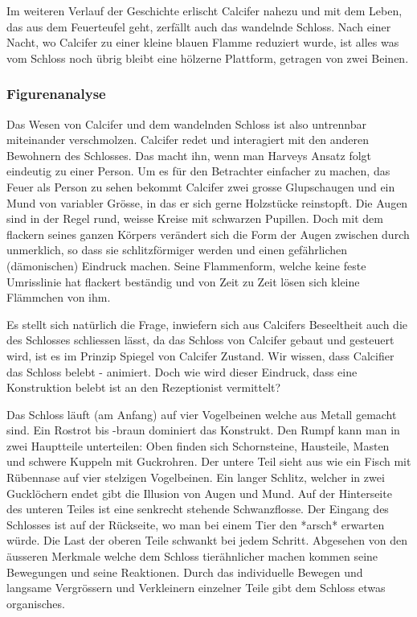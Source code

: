 Im weiteren Verlauf der Geschichte erlischt Calcifer nahezu und mit dem Leben, das aus dem Feuerteufel geht, zerfällt auch das wandelnde Schloss. Nach einer Nacht, wo Calcifer zu einer kleine blauen Flamme reduziert wurde, ist alles was vom Schloss noch übrig bleibt eine hölzerne Plattform, getragen von zwei Beinen. 

\subsubsection*{Figurenanalyse}
Das Wesen von Calcifer und dem wandelnden Schloss ist also untrennbar miteinander verschmolzen. Calcifer redet und interagiert mit den anderen Bewohnern des Schlosses. Das macht ihn, wenn man Harveys Ansatz folgt eindeutig zu einer Person. Um es für den Betrachter einfacher zu machen, das Feuer als Person zu sehen bekommt Calcifer zwei grosse Glupschaugen und ein Mund von variabler Grösse, in das er sich gerne Holzstücke reinstopft. Die Augen sind in der Regel rund, weisse Kreise mit schwarzen Pupillen. Doch mit dem flackern seines ganzen Körpers verändert sich die Form der Augen zwischen durch unmerklich, so dass sie schlitzförmiger werden und einen gefährlichen (dämonischen) Eindruck machen. Seine Flammenform, welche keine feste Umrisslinie hat flackert beständig und von Zeit zu Zeit lösen sich kleine Flämmchen von ihm. 

Es stellt sich natürlich die Frage, inwiefern sich aus Calcifers Beseeltheit auch die des Schlosses schliessen lässt, da das Schloss von Calcifer gebaut und gesteuert wird, ist es im Prinzip Spiegel von Calcifer Zustand. Wir wissen, dass Calcifier das Schloss belebt - animiert. Doch wie wird dieser Eindruck, dass eine Konstruktion belebt ist an den Rezeptionist vermittelt?

Das Schloss läuft (am Anfang) auf vier Vogelbeinen welche aus Metall gemacht sind. Ein Rostrot bis -braun dominiert das Konstrukt. Den Rumpf kann man in zwei Hauptteile unterteilen: Oben finden sich Schornsteine, Hausteile, Masten und schwere Kuppeln mit Guckrohren. Der untere Teil sieht aus wie ein Fisch mit Rübennase auf vier stelzigen Vogelbeinen. Ein langer Schlitz, welcher in zwei Gucklöchern endet gibt die Illusion von Augen und Mund. Auf der Hinterseite des unteren Teiles ist eine senkrecht stehende Schwanzflosse. Der Eingang des Schlosses ist auf der Rückseite, wo man bei einem Tier den *arsch* erwarten würde. Die Last der oberen Teile schwankt bei jedem Schritt.
Abgesehen von den äusseren Merkmale welche dem Schloss tierähnlicher machen kommen seine Bewegungen und seine Reaktionen. Durch das individuelle Bewegen und langsame Vergrössern und Verkleinern einzelner Teile gibt dem Schloss etwas organisches. 

